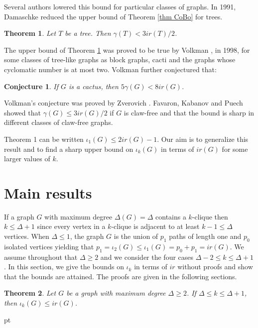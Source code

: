 \documentclass[11pt]{article}
\newtheorem{thm}{Theorem}
\newtheorem{conj}{Conjecture}
\newcommand{\2}{ \vspace{0.2cm} }
\newcommand{\1}{ \vspace{0.1cm} }
\begin{document}
Several authors lowered this bound for particular classes of graphs.
In 1991,  Damaschke \cite{D} reduced the upper bound of Theorem \ref{thm CoBo} for trees.

\begin{thm}\label{Dam}\cite{D}
Let $T$ be a tree. Then
$\gamma(T) < 3ir(T)/2$.
\end{thm}

\noindent The upper bound of Theorem \ref{Dam} was proved to be true by Volkman \cite{V}, in 1998, for some classes of tree-like graphs as block graphs, cacti and the graphs whose cyclomatic number is at most two. Volkman further conjectured that:

\begin{conj}\cite{V}
If $G$ is a cactus, then $5\gamma(G) < 8 ir(G)$.
\end{conj}

\noindent Volkman's conjecture was proved  by Zverovich \cite{Z}. Favaron, Kabanov and Puech \cite{FKP} showed that $\gamma(G) \leq 3 ir(G)/2$ if $G$ is claw-free and that the bound is sharp in different classes of claw-free graphs.


\indent Theorem 1 can be written $\iota_1(G) \le 2ir(G)-1$. Our aim  is to generalize this result and to find a sharp upper bound on $\iota _k(G)$ in terms of $ir(G)$ for some larger values of $k$.


\section{Main results}\label{sec2}

If a graph $G$ with maximum degree $\Delta(G) = \Delta$ contains a $k$-clique then
$k \leq \Delta + 1$ since every vertex in a $k$-clique is adjacent to at least $k - 1 \leq \Delta$ vertices.
When $\Delta \leq 1$, the graph $G$ is the union of $p_{1}$ paths of length one and $p_0$ isolated vertices
yielding that $p_{1} = \iota_2(G) \leq \iota_1(G)= p_0 + p_1=ir(G)$. We assume throughout that $\Delta \geq 2$ and we consider the four cases $\Delta - 2 \leq k \leq \Delta + 1$. In this section, we give the bounds on $\iota _k$ in terms of $ir$ without proofs and show that the bounds are attained. The proofs are given in the
following sections.

\begin{thm}\label{thm 1}
Let $G$ be a graph with maximum degree $\Delta \ge 2$. If $\Delta \leq k \leq \Delta + 1$, then $\iota_{k}(G) \leq ir(G)$.
\end{thm}
 pt
\end{document}
